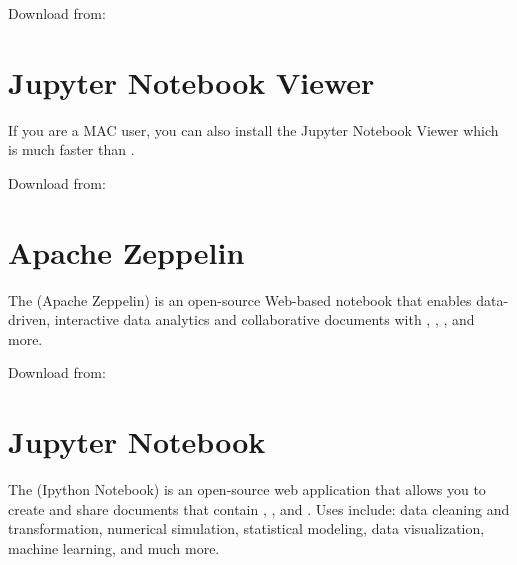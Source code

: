 \documentclass[letterpaper,12pt,english]{sphinxmanual}
\begin{document}
Download from: 

\begin{figure}[htbp]
\centering

\noindent{}
\end{figure}


\section{Jupyter Notebook Viewer}
\label{\detokenize{nb:jupyter-notebook-viewer}}
If you are a MAC user, you can also install the Jupyter Notebook Viewer \textendash{} which is much faster than .

Download from: 

\begin{figure}[htbp]
\centering

\noindent{}
\end{figure}


\section{Apache Zeppelin}
\label{\detokenize{nb:apache-zeppelin}}
The  (Apache Zeppelin) is an open-source Web-based notebook that enables data-driven,
interactive data analytics and collaborative documents with , , ,  and more.

Download from: 

\begin{figure}[htbp]
\centering

\noindent{}
\end{figure}


\section{Jupyter Notebook}
\label{\detokenize{nb:jupyter-notebook}}
The  (Ipython Notebook) is an open-source web application that allows you to create and share documents that contain , ,  and . Uses include: data cleaning and transformation, numerical simulation, statistical modeling, data visualization, machine learning, and much more.
\end{document}
